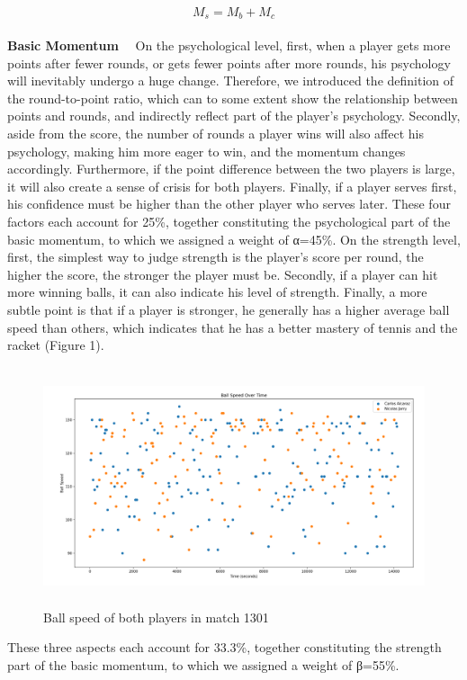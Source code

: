 \documentclass[13pt]{ctexart}
\begin{document}
\begin{equation}
    M_s=M_b+M_c
\end{equation}
\\
\textbf{Basic Momentum}
~~On the psychological level, first, when a player gets more points after fewer rounds, or gets fewer points after more rounds, his psychology will inevitably undergo a huge change. Therefore, we introduced the definition of the round-to-point ratio, which can to some extent show the relationship between points and rounds, and indirectly reflect part of the player's psychology. Secondly, aside from the score, the number of rounds a player wins will also affect his psychology, making him more eager to win, and the momentum changes accordingly. Furthermore, if the point difference between the two players is large, it will also create a sense of crisis for both players. Finally, if a player serves first, his confidence must be higher than the other player who serves later. These four factors each account for 25\%, together constituting the psychological part of the basic momentum, to which we assigned a weight of α=45\%.
On the strength level, first, the simplest way to judge strength is the player's score per round, the higher the score, the stronger the player must be. Secondly, if a player can hit more winning balls, it can also indicate his level of strength. Finally, a more subtle point is that if a player is stronger, he generally has a higher average ball speed than others, which indicates that he has a better mastery of tennis and the racket (Figure 1).

\begin{figure}
    \centering %
    \includegraphics[width=13cm,height=7cm]{Ball speed.png}
    \caption{Ball speed of both players in match 1301} %
\end{figure}

These three aspects each account for 33.3\%, together constituting the strength part of the basic momentum, to which we assigned a weight of β=55\%.
\end{document}
